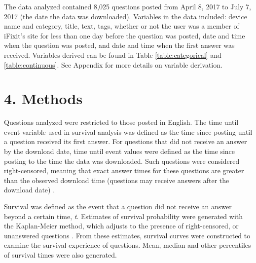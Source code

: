 \documentclass{article}
\begin{document}
The data analyzed contained 8,025 questions posted from April 8, 2017 to July 7, 2017 (the date the data was downloaded). Variables in the data included: device name and category, title, text, tags, whether or not the user was a member of iFixit's site for less than one day before the question was posted, date and time when the question was posted, and date and time when the first answer was received. Variables derived can be found in Table \ref{table:categorical} and \ref{table:continuous}. See Appendix for more details on variable derivation. 


\section*{4. Methods}

Questions analyzed were restricted to those posted in English. The time until event variable used in survival analysis was defined as the time since posting until a question received its first answer. For questions that did not receive an answer by the download date, time until event values were defined as the time since posting to the time the data was downloaded. Such questions were considered right-censored, meaning that exact answer times for these questions are greater than the observed download time (questions may receive answers after the download date) \cite{Kleinbaum2011}. 

Survival was defined as the event that a question did not receive an answer beyond a certain time, \textit{t}. Estimates of survival probability were generated with the Kaplan-Meier method, which adjusts to the presence of right-censored, or unanswered questions \cite{Bland1998}. From these estimates, survival curves were constructed to examine the survival experience of questions. Mean, median and other percentiles of survival times were also generated. 
\end{document}
